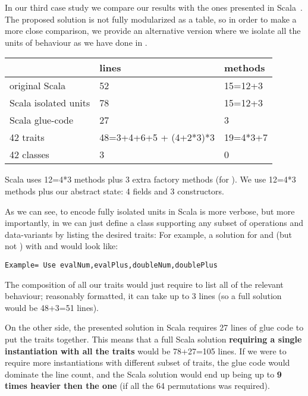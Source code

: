 In our third case study we compare our results with the ones presented
in Scala~\cite{Zenger-Odersky2005}.
The proposed solution is not fully modularized as a table,
so in order to make a more close comparison, we provide an alternative
version where we isolate all the units of behaviour as we
have done in \name.
\begin{minipage}{0.6\textwidth}
\begin{tabular}{l |l |l}
&                              lines  &   methods\\
\hline
original Scala~\cite{Zenger-Odersky2005}          & 52     &  15=12+3\\
Scala  isolated units   & 78    &  15=12+3\\
Scala  glue-code        & 27   &     3\\
42 traits               & 48=3+4+6+5 + (4+2*3)*3   &    19=4*3+7\\
42 classes              &   3    &     0\\
\end{tabular}
\end{minipage}
\begin{minipage}{0.4\textwidth}
Scala uses 12=4*3 methods plus 3 extra factory methods (for \Q@double@).
We use 12=4*3 methods plus our abstract state: 4 fields and 3 constructors.
\end{minipage}

As we can see, to encode fully isolated units in Scala is
more verbose,
but more importantly,
in \name we can just define a class supporting any subset of operations
and data-variants by listing the desired traits:
For example, a solution for \Q@Num@ and \Q@Plus@ (but not \Q@Neg@)
with \Q@eval@ and \Q@double@ would look like:
\begin{lstlisting}
Example= Use evalNum,evalPlus,doubleNum,doublePlus
\end{lstlisting}
The composition of all our traits would just require to list all
of the relevant behaviour; reasonably formatted, it can take up to 3 lines (so a full \name solution would be 48+3=51 lines).

On the other side, the presented solution in Scala requires
27 lines of glue code to put the traits together.
This means that a full Scala solution \textbf{requiring a single instantiation with all the traits} would be 78+27=105 lines.
If we were to require more instantiations with different subset of traits, the glue code would dominate the line count,
and the Scala solution would end up being up to \textbf{9 times heavier then the
\name one} (if all the 64 permutations was required).

